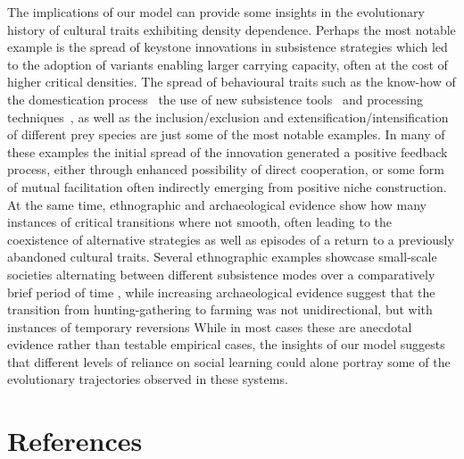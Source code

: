 \documentclass[review,authoryear]{elsarticle}
\begin{document}
The implications of our model can provide some insights in the evolutionary history of cultural traits exhibiting density dependence. Perhaps the most notable example is the spread of keystone innovations in subsistence strategies which led to the adoption of variants enabling larger carrying capacity, often at the cost of higher critical densities. The spread of behavioural traits such as the know-how of the domestication process~\citep{barker2006} the use of new subsistence tools~\citep{petraglia_population_2009} and processing techniques~\citep{molleson1993}, as well as the inclusion/exclusion and extensification/intensification of different prey species are just some of the most notable examples. In many of these examples the initial spread of the innovation generated a positive feedback process, either through enhanced possibility of direct cooperation, or some form of mutual facilitation often indirectly emerging from positive niche construction. At the same time, ethnographic and archaeological evidence show how many instances of critical transitions where not smooth, often leading to the coexistence of alternative strategies as well as episodes of a return to a previously abandoned cultural traits. Several ethnographic examples showcase small-scale societies alternating between different subsistence modes over a comparatively brief period of time \citep{layton1991,mace_1993,oota_et_al_2005}, while increasing archaeological evidence suggest that the transition from hunting-gathering to farming was not unidirectional, but with instances of temporary reversions \citep{rowley2001,stevens_fuller_2012} %
While in most cases these are anecdotal evidence rather than testable empirical cases, the insights of our model suggests that different levels of reliance on social learning could alone portray some of the evolutionary trajectories observed in these systems. 

\section{References}



\end{document}
